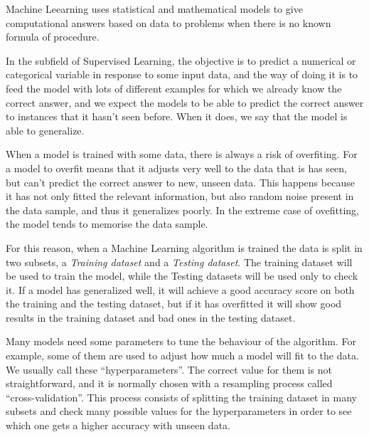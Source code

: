 \begin{pre-delivery}

  Machine Leearning uses statistical and mathematical models to give
  computational answers based on data to problems when there is no known
  formula of procedure.

  In the subfield of Supervised Learning, the objective is to predict a numerical
  or categorical variable in response to some input data, and the way of doing
  it is to feed the model with lots of different examples for which we already
  know the correct answer, and we expect the models to be able to predict
  the correct answer to instances that it hasn't seen before. When it does,
  we say that the model is able to generalize.

  When a model is trained with some data, there is always a risk of overfiting.
  For a model to overfit means that it adjusts very well to the data that is
  has seen, but can't predict the correct answer to new, unseen data.
  This happens because it has not only fitted the relevant information,
  but also random noise present in the data sample, and thus it generalizes
  poorly. In the extreme case of ovefitting, the model tends to memorise the
  data sample.

  For this reason, when a Machine Learning algorithm is trained the data
  is split in two subsets, a \textit{Training  dataset} and a \textit{Testing
  dataset}. The training dataset will be used to train the model, while the
  Testing datasets will be used only to check it. If a model has generalized
  well, it will achieve a good accuracy score on both the training and the
  testing dataset, but if it has overfitted it will show good results in the
  training dataset and bad ones in the testing dataset.

  Many models need some parameters to tune the behaviour of the algorithm. For
  example, some of them are used to adjust how much a model will fit to the data.
  We usually call these ``hyperparameters''. The correct value for them is not
  straightforward, and it is normally chosen with a resampling process called
  ``cross-validation''. This process consists of splitting the training dataset
  in many subsets and check many possible values for the hyperparameters in order
  to see which one gets a higher accuracy with unseen data.
\end{pre-delivery}

